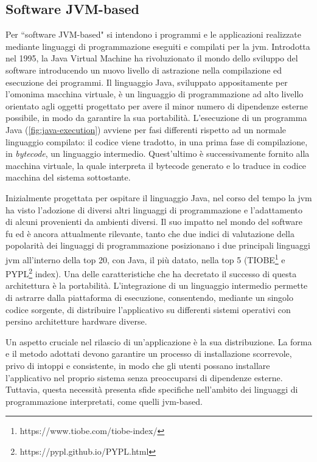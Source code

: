 \subsection{Software JVM-based}
Per ``software JVM-based" si intendono i programmi e le applicazioni realizzate mediante linguaggi di programmazione eseguiti e compilati per la \ac{jvm}. Introdotta nel 1995, la Java Virtual Machine ha rivoluzionato il mondo dello sviluppo del software introducendo un nuovo livello di astrazione nella compilazione ed esecuzione dei programmi. Il linguaggio Java, sviluppato appositamente per l'omonima macchina virtuale, è un linguaggio di programmazione ad alto livello orientato agli oggetti progettato per avere il minor numero di dipendenze esterne possibile, in modo da garantire la sua portabilità. L'esecuzione di un programma Java (\cref{fig:java-execution}) avviene per fasi differenti rispetto ad un normale linguaggio compilato: il codice viene tradotto, in una prima fase di compilazione, in \textit{bytecode}, un linguaggio intermedio. Quest'ultimo è successivamente fornito alla macchina virtuale, la quale interpreta il bytecode generato e lo traduce in codice macchina del sistema sottostante.


Inizialmente progettata per ospitare il linguaggio Java, nel corso del tempo la \ac{jvm} ha visto l'adozione di diversi altri linguaggi di programmazione e l'adattamento di alcuni provenienti da ambienti diversi. Il suo impatto nel mondo del software fu ed è ancora attualmente rilevante, tanto che due indici di valutazione della popolarità dei linguaggi di programmazione posizionano i due principali linguaggi \ac{jvm} all'interno della top 20, con Java, il più datato, nella top 5 (TIOBE\footnote{https://www.tiobe.com/tiobe-index/} e PYPL\footnote{https://pypl.github.io/PYPL.html} index). Una delle caratteristiche che ha decretato il successo di questa architettura è la portabilità. L'integrazione di un linguaggio intermedio permette di astrarre dalla piattaforma di esecuzione, consentendo, mediante un singolo codice sorgente, di distribuire l'applicativo su differenti sistemi operativi con persino architetture hardware diverse.

Un aspetto cruciale nel rilascio di un'applicazione è la sua distribuzione. La forma e il metodo adottati devono garantire un processo di installazione scorrevole, privo di intoppi e consistente, in modo che gli utenti possano installare l'applicativo nel proprio sistema senza preoccuparsi di dipendenze esterne. Tuttavia, questa necessità presenta sfide specifiche nell'ambito dei linguaggi di programmazione interpretati, come quelli \ac{jvm}-based.

